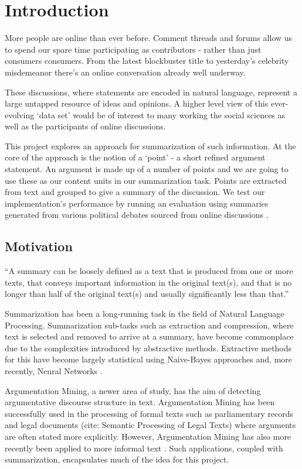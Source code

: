 \chapter{Introduction\label{chap:introduction}}
  More people are online than ever before. Comment threads and forums allow us to spend our spare time participating as contributors - rather than just consumers consumers. From the latest blockbuster title to yesterday's celebrity misdemeanor there's an online conversation already well underway.

  These discussions, where statements are encoded in natural language, represent a large untapped resource of ideas and opinions. A higher level view of this ever-evolving `data set' would be of interest to many working the social sciences as well as the participants of online discussions.

  This project explores an approach for summarization of such information. At the core of the approach is the notion of a `point' - a short refined argument statement. An argument is made up of a number of points and we are going to use these as our content units in our summarization task. Points are extracted from text and grouped to give a summary of the discussion. We test our implementation's performance by running an evaluation using summaries generated from various political debates sourced from online discussions \cite{walker2012corpus}.

  \section{Motivation}
    ``A summary can be loosely defined as a text that is produced from one or more texts, that conveys important information in the original text(s), and that is no longer than half of the original text(s) and usually significantly less than that.'' \cite{radev2002introduction}

    Summarization has been a long-running task in the field of Natural Language Processing. Summarization sub-tasks such as extraction and compression, where text is selected and removed to arrive at a summary, have become commonplace due to the complexities introduced by abstractive methods. Extractive methods for this have become largely statistical using Naive-Bayes \cite{kupiec1995trainable} approaches and, more recently, Neural Networks \cite{svore2007enhancing}.

    Argumentation Mining, a newer area of study, has the aim of detecting argumentative discourse structure in text. Argumentation Mining has been successfully used in the processing of formal texts such as parliamentary records \cite{palau2009argumentation} and legal documents (cite: Semantic Processing of Legal Texts) where arguments are often stated more explicitly. However, Argumentation Mining has also more recently been applied to more informal text \cite{park2015conditional}. Such applications, coupled with summarization, encapsulates much of the idea for this project.

